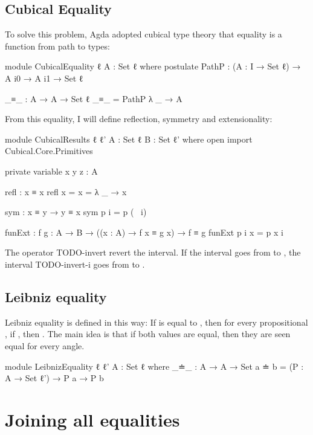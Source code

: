 \documentclass{article}
\begin{document}
\subsection{Cubical Equality}

To solve this problem, Agda adopted cubical type theory that equality is a function from path to types:

\begin{code}
module CubicalEquality {ℓ} {A : Set ℓ} where
  postulate
    PathP : (A : I → Set ℓ) → A i0 → A i1 → Set ℓ

  _≡_ : A → A → Set ℓ
  _≡_ = PathP λ _ → A
\end{code}

From this equality, I will define reflection, symmetry and extensionality:

\begin{code}
module CubicalResults {ℓ ℓ'} {A : Set ℓ} {B : Set ℓ'} where
  open import Cubical.Core.Primitives

  private variable
    x y z : A

  refl : x ≡ x
  refl {x = x} = λ _ → x

  sym : x ≡ y → y ≡ x
  sym p i = p (~ i)

  funExt : {f g : A → B}
    → ((x : A) → f x ≡ g x) → f ≡ g
  funExt p i x = p x i
\end{code}

The operator TODO-invert revert the interval. If the interval  goes from
 to , the interval TODO-invert-i goes from  to .

\subsection{Leibniz equality}

Leibniz equality is defined in this way:
If  is equal to , then for every propositional , if ,
then .
The main idea is that if both values are equal, then they are seen equal for every angle.

\begin{code}
module LeibnizEquality {ℓ} {ℓ'} {A : Set ℓ} where
  _≐_ : A → A → Set
  a ≐ b = (P : A → Set ℓ') → P a → P b
\end{code}

\section{Joining all equalities}
\end{document}
